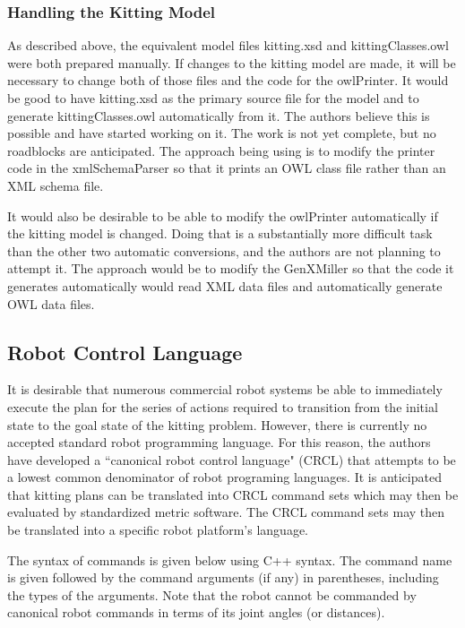 \subsubsection{Handling the Kitting Model}
As described above, the equivalent model files kitting.xsd and
kittingClasses.owl were both prepared manually. If changes to the kitting
model are made, it will be necessary to change both of those files and the
code for the owlPrinter. It would be good to have kitting.xsd as the
primary source file for the model and to generate kittingClasses.owl
automatically from it. The authors believe this is possible and have
started working on it. The work is not yet complete, but no roadblocks are
anticipated. The approach being using is to modify the printer code in the
xmlSchemaParser so that it prints an OWL class file rather than an XML
schema file.

It would also be desirable to be able to modify the owlPrinter
automatically if the kitting model is changed. Doing that is a
substantially more difficult task than the other two automatic conversions,
and the authors are not planning to attempt it. The approach would be to
modify the GenXMiller so that the code it generates automatically would
read XML data files and automatically generate OWL data files.

\subsection{Robot Control Language}
\label{sect:Implementation.CRCL}
It is desirable that numerous commercial robot systems be able to 
immediately execute the plan for the series of actions required to transition from the initial state
to the goal state of the kitting problem. However, there is currently no
accepted standard robot programming language. For this reason, the authors
have developed a ``canonical robot control language" (CRCL) that attempts to be
a lowest common denominator of robot programing languages. It is anticipated
that kitting plans can be translated into  CRCL command sets which may then be
evaluated by standardized metric software. The CRCL command sets may then
be translated into a specific robot platform's language.

The syntax of commands is given below using C++ syntax. The command
name is given followed by the command arguments (if any) in parentheses,
including the types of the arguments.
Note that the robot cannot be commanded by canonical robot commands in
terms of its joint angles (or distances).

